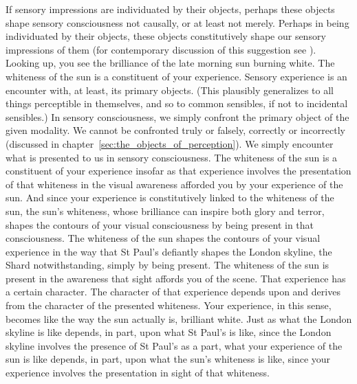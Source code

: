 If sensory impressions are individuated by their objects, perhaps these objects shape sensory consciousness not causally, or at least not merely. Perhaps in being individuated by their objects, these objects constitutively shape our sensory impressions of them (for contemporary discussion of this suggestion see \citealt{McDowell:1998vn,Martin:2004fj,Fish:2009fk,Kalderon:2011fk}). Looking up, you see the brilliance of the late morning sun burning white. The whiteness of the sun is a constituent of your experience. Sensory experience is an encounter with, at least, its primary objects. (This plausibly generalizes to all things perceptible in themselves, and so to common sensibles, if not to incidental sensibles.) In sensory consciousness, we simply confront the primary object of the given modality. We cannot be confronted truly or falsely, correctly or incorrectly (discussed in chapter~\ref{sec:the_objects_of_perception}). We simply encounter what is presented to us in sensory consciousness. The whiteness of the sun is a constituent of your experience insofar as that experience involves the presentation of that whiteness in the visual awareness afforded you by your experience of the sun. And since your experience is constitutively linked to the whiteness of the sun, the sun's whiteness, whose brilliance can inspire both glory and terror, shapes the contours of your visual consciousness by being present in that consciousness. The whiteness of the sun shapes the contours of your visual experience in the way that St Paul's defiantly shapes the London skyline, the Shard notwithstanding, simply by being present. The whiteness of the sun is present in the awareness that sight affords you of the scene. That experience has a certain character. The character of that experience depends upon and derives from the character of the presented whiteness. Your experience, in this sense, becomes like the way the sun actually is, brilliant white. Just as what the London skyline is like depends, in part, upon what St Paul's is like, since the London skyline involves the presence of St Paul's as a part, what your experience of the sun is like depends, in part, upon what the sun's whiteness is like, since your experience involves the presentation in sight of that whiteness.

